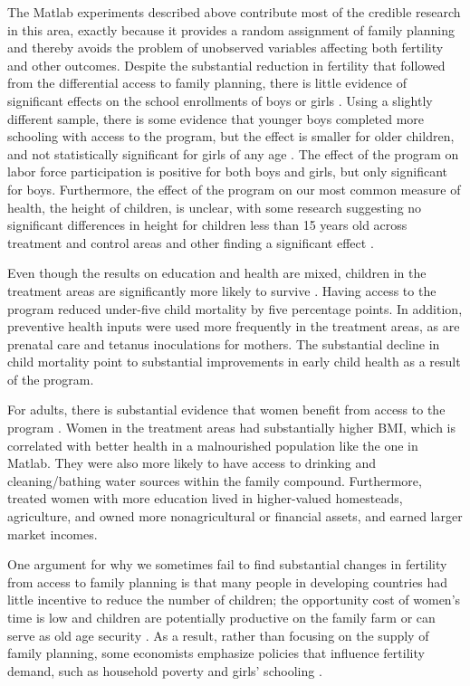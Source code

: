 The Matlab experiments described above contribute most of the credible research in this area, exactly because it provides a random assignment of family planning and thereby avoids the problem of unobserved variables affecting both fertility and other outcomes. Despite the substantial reduction in fertility that followed from the differential access to family planning, there is little evidence of significant effects on the school enrollments of boys or girls \citep{Sinha2005}. Using a slightly different sample, there is some evidence that younger boys completed more schooling with access to the program, but the effect is smaller for older children, and not statistically significant for girls of any age \citep{Joshi2007}. The effect of the program on labor force participation is positive for both boys and girls, but only signiﬁcant for boys. Furthermore, the effect of the program on our most common measure of health, the height of children, is unclear, with some research suggesting no significant differences in height for children less than 15 years old across treatment and control areas \citep{Joshi2007} and other finding a significant effect \citep{Barham2012}.

Even though the results on education and health are mixed, children in the treatment areas are significantly more likely to survive \citep{Joshi2007}. Having access to the program reduced under-five child mortality by five percentage points. In addition, preventive health inputs were used more frequently in the treatment areas, as are prenatal care and tetanus inoculations for mothers. The substantial decline in child mortality point to substantial improvements in early child health as a result of the program.

For adults, there is substantial evidence that women benefit from access to the program \citep{Joshi2007}. Women in the treatment areas had substantially higher BMI, which is correlated with better health in a malnourished population like the one in Matlab. They were also more likely to have access to drinking and cleaning/bathing water sources within the family compound. Furthermore, treated women with more education lived in higher-valued homesteads, agriculture, and owned more nonagricultural or financial assets, and earned larger market incomes.

One argument for why we sometimes fail to find substantial changes in fertility from access to family planning is that many people in developing countries had little incentive to reduce the number of children; the opportunity cost of women's time is low and children are potentially productive on the family farm or can serve as old age security \citep{Banerjee2014,Lambert2016}. As a result, rather than focusing on the supply of family planning, some economists emphasize policies that influence fertility demand, such as household poverty and girls' schooling \citep{pritchett94a,DasGupta2011}.

